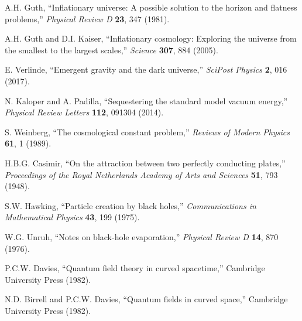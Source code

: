 \documentclass[12pt,a4paper]{article}
\begin{document}

\begin{thebibliography}{99}

A.H. Guth, ``Inflationary universe: A possible solution to the horizon and flatness problems,'' \textit{Physical Review D} \textbf{23}, 347 (1981).

A.H. Guth and D.I. Kaiser, ``Inflationary cosmology: Exploring the universe from the smallest to the largest scales,'' \textit{Science} \textbf{307}, 884 (2005).

E. Verlinde, ``Emergent gravity and the dark universe,'' \textit{SciPost Physics} \textbf{2}, 016 (2017).

N. Kaloper and A. Padilla, ``Sequestering the standard model vacuum energy,'' \textit{Physical Review Letters} \textbf{112}, 091304 (2014).

S. Weinberg, ``The cosmological constant problem,'' \textit{Reviews of Modern Physics} \textbf{61}, 1 (1989).

H.B.G. Casimir, ``On the attraction between two perfectly conducting plates,'' \textit{Proceedings of the Royal Netherlands Academy of Arts and Sciences} \textbf{51}, 793 (1948).

S.W. Hawking, ``Particle creation by black holes,'' \textit{Communications in Mathematical Physics} \textbf{43}, 199 (1975).

W.G. Unruh, ``Notes on black-hole evaporation,'' \textit{Physical Review D} \textbf{14}, 870 (1976).

P.C.W. Davies, ``Quantum field theory in curved spacetime,'' Cambridge University Press (1982).

N.D. Birrell and P.C.W. Davies, ``Quantum fields in curved space,'' Cambridge University Press (1982).

\end{thebibliography}
\end{document}
